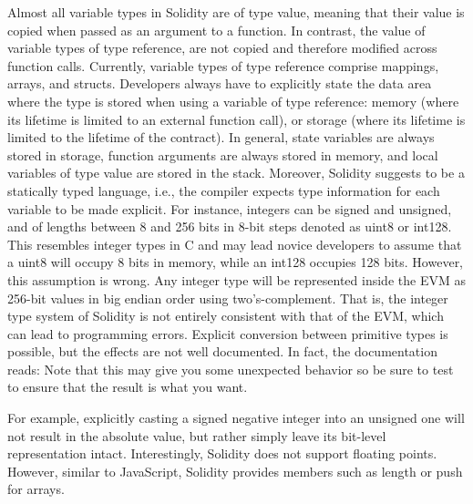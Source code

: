         Almost all variable types in Solidity are of type value, meaning that their value is copied when passed as an argument to a function.
        In contrast, the value of variable types of type reference, are not copied and therefore modified across function calls.
        Currently, variable types of type reference comprise mappings, arrays, and structs.
        Developers always have to explicitly state the data area where the type is stored when using a variable of type reference: memory (where its lifetime is limited to an external function call), or storage (where its lifetime is limited to the lifetime of the contract).
        In general, state variables are always stored in storage, function arguments are always stored in memory, and local variables of type value are stored in the stack.
        Moreover, Solidity suggests to be a statically typed language, i.e., the compiler expects type information for each variable to be made explicit.
        For instance, integers can be signed and unsigned, and of lengths between 8 and 256 bits in 8-bit steps denoted as uint8 or int128.
        This resembles integer types in C and may lead novice developers to assume that a uint8 will occupy 8 bits in memory, while an int128 occupies 128 bits.
        However, this assumption is wrong. Any integer type will be represented inside the EVM as 256-bit values in big endian order using two’s-complement.
        That is, the integer type system of Solidity is not entirely consistent with that of the EVM, which can lead to programming errors.
        Explicit conversion between primitive types is possible, but the effects are not well documented.
        In fact, the documentation reads: Note that this may give you some unexpected behavior so be sure to test to ensure that the result is what you want.

        For example, explicitly casting a signed negative integer into an unsigned one will not result in the absolute value, but rather simply leave its bit-level representation intact.
        Interestingly, Solidity does not support floating points.
        However, similar to JavaScript, Solidity provides members such as length or push for arrays.

